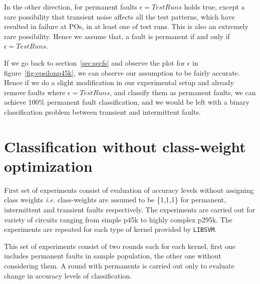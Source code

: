 In the other direction, for permanent faults $\epsilon = Test Runs$ holds true, except a rare possibility that transient noise affects all the test patterns, which have resulted in failure at POs, in at least one of test runs. This is also an extremely rare possibility. Hence we assume that, a fault is permanent if and only if $\epsilon = Test Runs$.

If we go back to section~\ref{sec:secfs} and observe the plot for $\epsilon$ in figure~\ref{fig:epsilonp45k}, we can observe our assumption to be fairly accurate. Hence if we do a slight modification in our experimental setup and already remove faults where $\epsilon = Test Runs$, and classify them as permanent faults, we can achieve 100\% permanent fault classification, and we would be left with a binary classification problem between transient and intermittent faults. 

\section{Classification without class-weight optimization}
First set of experiments consist of evaluation of accuracy levels without assigning class weights \emph{i.e.} class-weights are assumed to be \{1,1,1\} for permanent, intermittent and transient faults respectively. The experiments are carried out for variety of circuits ranging from simple p45k to highly complex p295k. The experiments are repeated for each type of kernel provided by \texttt{LIBSVM}. 

This set of experiments consist of two rounds each for each kernel, first one includes permanent faults in sample population, the other one without considering them. A round with permanents is carried out only to evaluate change in accuracy levels of classification.


